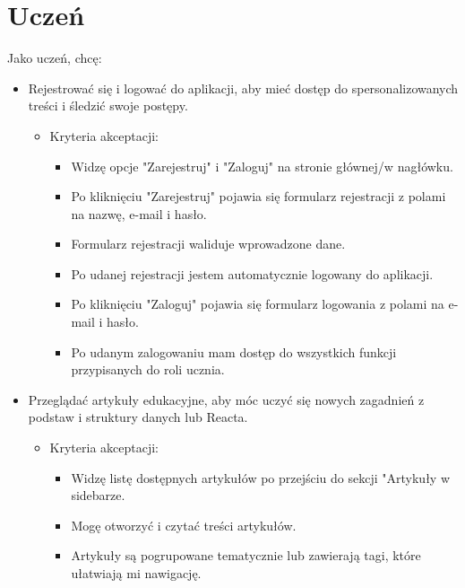 \documentclass[shortabstract,inz]{iithesis}
\begin{document}
\section{Uczeń}
Jako uczeń, chcę:
\begin{itemize}
    \item Rejestrować się i logować do aplikacji, aby mieć dostęp do spersonalizowanych treści i śledzić swoje postępy.
    \begin{itemize}
        \item Kryteria akceptacji:
        \begin{itemize}
            \item Widzę opcje "Zarejestruj" i "Zaloguj" na stronie głównej/w nagłówku.
            \item Po kliknięciu "Zarejestruj" pojawia się formularz rejestracji z polami na nazwę, e-mail i hasło.
            \item Formularz rejestracji waliduje wprowadzone dane.
            \item Po udanej rejestracji jestem automatycznie logowany do aplikacji.
            \item Po kliknięciu "Zaloguj" pojawia się formularz logowania z polami na e-mail i hasło.
            \item Po udanym zalogowaniu mam dostęp do wszystkich funkcji przypisanych do roli ucznia.
        \end{itemize}
    \end{itemize}
    \item Przeglądać artykuły edukacyjne, aby móc uczyć się nowych zagadnień z podstaw i struktury danych lub Reacta.
    \begin{itemize}
        \item Kryteria akceptacji:
        \begin{itemize}
            \item Widzę listę dostępnych artykułów po przejściu do sekcji "Artykuły w sidebarze.
            \item Mogę otworzyć i czytać treści artykułów.
            \item Artykuły są pogrupowane tematycznie lub zawierają tagi, które ułatwiają mi nawigację.
        \end{itemize}
    \end{itemize}


\end{itemize}
\end{document}
